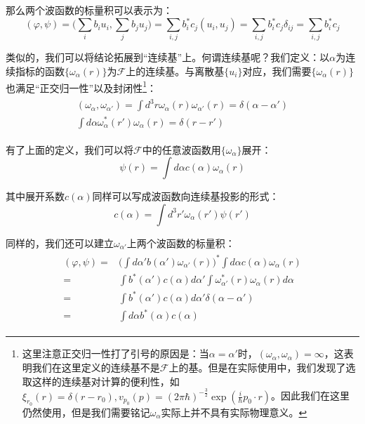     那么两个波函数的标量积可以表示为：
    \begin{equation}
        (\varphi,\psi)=\Big(\sum_i b_i u_i,\sum_j b_j u_j\Big)= \sum_{i,j}b_i^*c_j(u_i,u_j)=\sum_{i,j}b_i^*c_j\delta_{ij}=\sum_{i,j}b_i^*c_j
    \end{equation}
    
    类似的，我们可以将结论拓展到“连续基”上。何谓连续基呢？我们定义：以$\alpha$为连续指标的函数$\{\omega_{\alpha}(r)\}$为$\mathscr{F}$上的连续基。与离散基$\{u_i\}$对应，我们需要$\{\omega_{\alpha}(r)\}$也满足“正交归一性”以及封闭性\footnote{这里注意正交归一性打了引号的原因是：当$\alpha=\alpha'\textrm{时}，(\omega_{\alpha},\omega_{\alpha})=\infty$，这表明我们在这里定义的连续基不是$\mathscr{F}$上的基。但是在实际使用中，我们发现了选取这样的连续基对计算的便利性，如$\xi_{r_0}(r)=\delta(r-r_0),v_{p_0}(p)=(2\pi\hbar)^{-\frac{3}{2}}\exp(\frac{i}{\hbar}p_0\cdot r)$。因此我们在这里仍然使用，但是我们需要铭记$\omega_{\alpha}$实际上并不具有实际物理意义。}：
    \begin{align}
        \begin{split}
            (\omega_{\alpha},\omega_{\alpha'})=\int d^3r \omega_{\alpha}(r)\omega_{\alpha'}(r)=\delta(\alpha-\alpha')\\
            \int d\alpha \omega_\alpha^*(r')\omega_\alpha(r)=\delta (r-r') 
        \end{split}
    \end{align}
    
    有了上面的定义，我们可以将$\mathscr{F}$中的任意波函数用$\{\omega_\alpha\}$展开：
    \begin{equation}
        \psi(r)=\int d\alpha c(\alpha)\omega_\alpha(r)
    \end{equation}
    
    其中展开系数$c(\alpha)$同样可以写成波函数向连续基投影的形式：
    \begin{equation}
        c(\alpha)=\int d^3r' \omega_\alpha(r')\psi(r')
    \end{equation}
    
    同样的，我们还可以建立$\omega_{\alpha'}$上两个波函数的标量积：
    \begin{align}
        \begin{split}
            (\varphi,\psi)=&\Big(\int d\alpha'b(\alpha')\omega_{\alpha'}(r)\Big)^*\int d\alpha c(\alpha)\omega_{\alpha}(r)\\
            =&\int b^*(\alpha')c(\alpha)d\alpha' \int\omega_{\alpha'}^*(r)\omega_{\alpha}(r)d\alpha\\
            =&\int b^*(\alpha')c(\alpha)d\alpha'\delta(\alpha-\alpha')\\
            =& \int d\alpha b^*(\alpha)c(\alpha)
        \end{split}
    \end{align}
        
